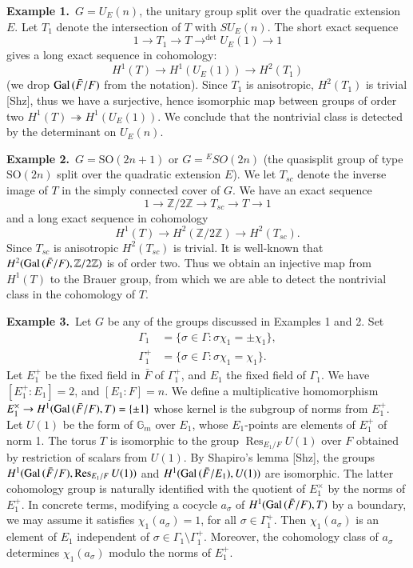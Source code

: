 \documentclass{amsart}
\newcommand\G{{\mathbb G}}
\newcommand\Z{{\mathbb Z}}
\newcommand\Gal{\hbox{Gal\,}}
\newcommand\bF{{\bar F}}
\newcommand\Res{\operatorname{Res}}
\begin{document}
\noindent
{\bf Example 1.}\   $G=U_E(n)$, the unitary group split over the
quadratic extension $E$.  Let $T_{1}$ denote the intersection
of $T$ with $SU_E(n)$.  The short exact sequence
$$1\to T_1 \to T \to^{\det} U_E(1)\to 1$$
gives a long exact sequence in cohomology:
$$H^1(T) \to H^1(U_E(1))\to H^2(T_1)$$
(we drop $\Gal(\bF/F)$ from the notation).
Since $T_1$ is anisotropic, $H^2(T_1)$ is trivial [Shz], thus we have
a surjective, hence isomorphic map between groups of order two
$H^1(T)\twoheadrightarrow H^1(U_E(1))$.  We conclude that
the nontrivial class is detected by the determinant on $U_E(n)$.

\noindent
{\bf Example 2.}\   $G=\text{SO}(2n+1)$ or $G= {}^ESO(2n)$ (the quasisplit
group of type $\text{SO}(2n)$ split over the quadratic extension $E$).
We let $T_{sc}$ denote the inverse image of $T$ in the simply
connected cover of $G$.  We have an exact sequence
$$1\to \Z/2\Z \to T_{sc} \to T\to 1$$
and a long exact sequence in cohomology
$$H^1(T) \to H^2(\Z/2\Z) \to H^2(T_{sc}).$$
Since $T_{sc}$ is anisotropic $H^2(T_{sc})$ is trivial.  It
is well-known that $H^2(\Gal(\bF/F),\Z/2\Z)$
is of
order two.  Thus we obtain an injective map from
$H^1(T)$ to the Brauer group, from which we are able to
detect the nontrivial class in the cohomology of $T$.

\noindent
{\bf Example 3.}\  Let $G$ be any of the groups
discussed in Examples 1 and 2.
Set 
\begin{align*}
\Gamma_1 &= \{\sigma\in\Gamma : \sigma\chi_1 =\pm \chi_1\},\\
\Gamma_1^+ &= \{\sigma\in\Gamma:\sigma\chi_1=\chi_1\}.
\end{align*}
Let $E_1^+$ be the fixed field in $\bF$ of $\Gamma_1^+$,
and $E_1$ the fixed field of $\Gamma_1$.  We have
$[E_1^+:E_1]=2$, and $[E_1:F]=n$.  
We define a multiplicative homomorphism $E_1^\times \to
H^1(\Gal(\bF/F),T)= \{\pm1\}$ whose kernel is the subgroup
of norms from $E_1^+$.
Let $U(1)$ be the form of $\G_m$ over $E_1$, whose $E_1$-points
are elements of $E_1^+$ of norm 1.  The torus $T$ is isomorphic
to the group $\Res_{E_1/F}U(1)$ over $F$ 
obtained by restriction of scalars from $U(1)$.
By Shapiro's lemma [Shz], the groups 
$H^1(\Gal(\bF/F),\Res_{E_1/F}U(1))$ and
$H^1(\Gal(\bF/E_1),U(1))$ are isomorphic.
The latter cohomology group is naturally
 identified with the quotient
of $E_1^\times$ by the norms of $E_1^+$.  In concrete terms, 
modifying a cocycle $a_\sigma$ of $H^1(\Gal(\bF/F),T)$ by
a boundary, we may assume it satisfies $\chi_1(a_\sigma) = 1$,
for all $\sigma\in \Gamma_1^+$.  Then $\chi_1(a_\sigma)$ is an
element of $E_1$ independent of 
$\sigma\in\Gamma_1\setminus \Gamma_1^+$.  Moreover,
the cohomology class of $a_\sigma$ determines $\chi_1(a_\sigma)$
modulo the norms of $E_1^+$.
\end{document}
